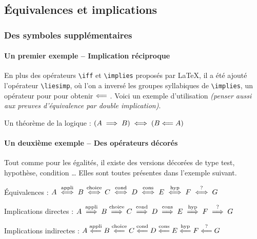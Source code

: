 \documentclass[12pt,a4paper]{article}
\begin{document}

\subsection{Équivalences et implications}

\subsubsection{Des symboles supplémentaires}

\paragraph{Un premier exemple -- Implication réciproque}

En plus des opérateurs \verb+\iff+ et \verb+\implies+ proposés par \LaTeX{}, il a été ajouté l'opérateur \verb+\liesimp+, où l'on a inversé les groupes syllabiques de \verb+\implies+, un opérateur pour pour obtenir $\mathrel{\Longleftarrow}$ . Voici un exemple d'utilisation \emph{(penser aussi aux preuves d'équivalence par double implication)}.

\begin{tcblisting}{}
Un théorème de la logique : $(A \implies B) \iff (B \liesimp A)$
\end{tcblisting}



\paragraph{Un deuxième exemple -- Des opérateurs décorés}

Tout comme pour les égalités, il existe des versions décorées de type test, hypothèse, condition \dots{} 
Elles sont toutes présentes dans l'exemple suivant.


\begin{tcblisting}{}
Équivalences :
$A \iffappli B \iffchoice C \iffcond D \iffcons E \iffhyp F \ifftest G$

Implications directes :
$A \impliesappli B \implieschoice C \impliescond D
   \impliescons E \implieshyp F \impliestest G$

Implications indirectes :
$A \liesimpappli B \liesimpchoice C \liesimpcond D
   \liesimpcons E \liesimphyp F \liesimptest G$
\end{tcblisting}
\end{document}
